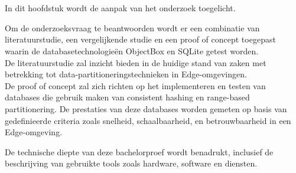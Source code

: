 
\chapter{}%
\label{ch:methodologie}


In dit hoofdstuk wordt de aanpak van het onderzoek toegelicht.

Om de onderzoeksvraag te beantwoorden wordt er een combinatie van literatuurstudie,
 een vergelijkende studie en een proof of concept toegepast waarin de databasetechnologieën ObjectBox en SQLite getest worden. \\

De literatuurstudie zal inzicht bieden in de huidige stand van zaken met betrekking tot data-partitioneringstechnieken in Edge-omgevingen. \\
 
De proof of concept zal zich richten op het implementeren en testen van databases die gebruik maken van consistent hashing en range-based partitionering.
 De prestaties van deze databases worden gemeten op basis van gedefinieerde criteria zoals snelheid, schaalbaarheid, en betrouwbaarheid in een Edge-omgeving.

De technische diepte van deze bachelorproef wordt benadrukt,
 inclusief de beschrijving van gebruikte tools zoals hardware, software en diensten. \\

